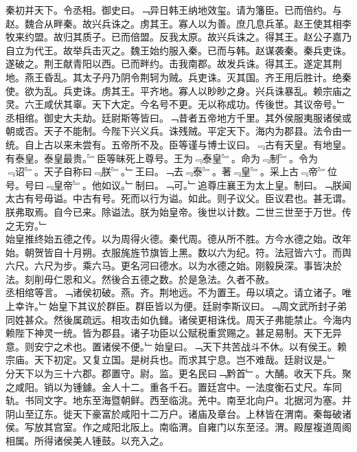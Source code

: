 \documentclass{zhvt-classic}
\begin{document}
\hspace*{2em}秦初并天下。令丞相。御史曰。﹁异日韩王纳地效玺。请为籓臣。已而倍约。与赵。魏合从畔秦。故兴兵诛之。虏其王。寡人以为善。庶几息兵革。赵王使其相李牧来约盟。故归其质子。已而倍盟。反我太原。故兴兵诛之。得其王。赵公子嘉乃自立为代王。故举兵击灭之。魏王始约服入秦。已而与韩。赵谋袭秦。秦兵吏诛。遂破之。荆王献青阳以西。已而畔约。击我南郡。故发兵诛。得其王。遂定其荆地。燕王昏乱。其太子丹乃阴令荆轲为贼。兵吏诛。灭其国。齐王用后胜计。绝秦使。欲为乱。兵吏诛。虏其王。平齐地。寡人以眇眇之身。兴兵诛暴乱。赖宗庙之灵。六王咸伏其辜。天下大定。今名号不更。无以称成功。传後世。其议帝号。﹂丞相绾。御史大夫劫。廷尉斯等皆曰。﹁昔者五帝地方千里。其外侯服夷服诸侯或朝或否。天子不能制。今陛下兴义兵。诛残贼。平定天下。海内为郡县。法令由一统。自上古以来未尝有。五帝所不及。臣等谨与博士议曰。﹃古有天皇。有地皇。有泰皇。泰皇最贵。﹄臣等昧死上尊号。王为﹃泰皇﹄。命为﹃制﹄。令为﹃诏﹄。天子自称曰﹃朕﹄。﹂王曰。﹁去﹃泰﹄。著﹃皇﹄。采上古﹃帝﹄位号。号曰﹃皇帝﹄。他如议。﹂制曰。﹁可。﹂追尊庄襄王为太上皇。制曰。﹁朕闻太古有号毋谥。中古有号。死而以行为谥。如此。则子议父。臣议君也。甚无谓。朕弗取焉。自今已来。除谥法。朕为始皇帝。後世以计数。二世三世至于万世。传之无穷。﹂\\
\hspace*{2em}始皇推终始五德之传。以为周得火德。秦代周。德从所不胜。方今水德之始。改年始。朝贺皆自十月朔。衣服旄旌节旗皆上黑。数以六为纪。符。法冠皆六寸。而舆六尺。六尺为步。乘六马。更名河曰德水。以为水德之始。刚毅戾深。事皆决於法。刻削毋仁恩和义。然後合五德之数。於是急法。久者不赦。\\
\hspace*{2em}丞相绾等言。﹁诸侯初破。燕。齐。荆地远。不为置王。毋以填之。请立诸子。唯上幸许。﹂始皇下其议於群臣。群臣皆以为便。廷尉李斯议曰。﹁周文武所封子弟同姓甚众。然後属疏远。相攻击如仇雠。诸侯更相诛伐。周天子弗能禁止。今海内赖陛下神灵一统。皆为郡县。诸子功臣以公赋税重赏赐之。甚足易制。天下无异意。则安宁之术也。置诸侯不便。﹂始皇曰。﹁天下共苦战斗不休。以有侯王。赖宗庙。天下初定。又复立国。是树兵也。而求其宁息。岂不难哉。廷尉议是。﹂\\
\hspace*{2em}分天下以为三十六郡。郡置守。尉。监。更名民曰﹁黔首﹂。大酺。收天下兵。聚之咸阳。销以为锺鐻。金人十二。重各千石。置廷宫中。一法度衡石丈尺。车同轨。书同文字。地东至海暨朝鲜。西至临洮。羌中。南至北向户。北据河为塞。并阴山至辽东。徙天下豪富於咸阳十二万户。诸庙及章台。上林皆在渭南。秦每破诸侯。写放其宫室。作之咸阳北阪上。南临渭。自雍门以东至泾。渭。殿屋複道周阁相属。所得诸侯美人锺鼓。以充入之。\\
\end{document}

